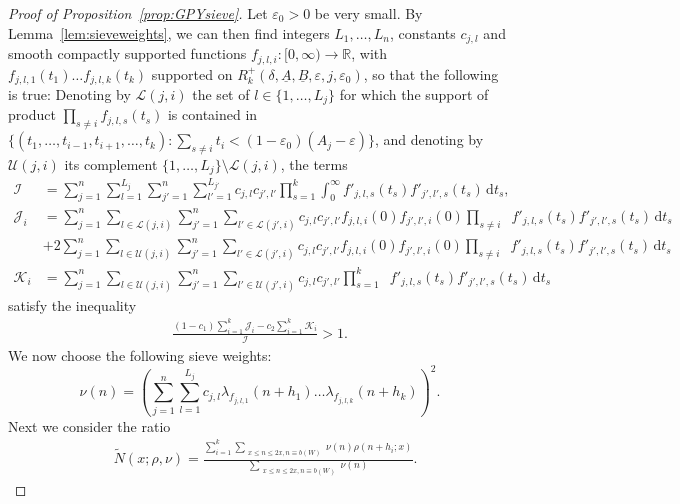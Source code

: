 \documentclass{amsart}
\numberwithin{equation}{section}
\begin{document}
\begin{proof}[Proof of Proposition~\ref{prop:GPYsieve}]
Let $\varepsilon_0>0$ be very small. By Lemma~\ref{lem:sieveweights}, we can then  find integers $L_1, \dots, L_n$, constants $c_{j,l}$    and   smooth compactly supported functions $f_{j,l,i}: [0,\infty) \rightarrow \mathbb{R}$, with  $f_{j,l,1}(t_1) \dots f_{j,l,k}(t_k)$ supported on $  R_k^+(\delta,\underline{A},\underline{B},\varepsilon,j,\varepsilon_0)$, so that the following is true: 
 Denoting by $\mathcal{L}(j,i)$  the set of $ l \in  \{1, \dots, L_j\}$ for which the  support of  product $\prod_{s\neq i} f_{j,l,s}(t_s) $ is contained in $\{(t_1, \dots, t_{i-1},t_{i+1}, \dots, t_k): \sum_{s \neq i} t_i < (1-\varepsilon_0)(A_j-\varepsilon)\}$, and denoting by    $\mathcal{U}(j,i)$  its   complement $\{1, \dots, L_j\} \setminus \mathcal{L}(j,i)$, 
the terms 
\begin{align*}
\mathcal{I}&=\sum_{j=1}^n\sum_{l=1}^{L_j} \sum_{j'=1}^n \sum_{l'=1}^{L_{j'}} c_{j,l} c_{j',l'}  \prod_{s=1}^k
\int_0^\infty    f'_{j,l,s}(t_s)f'_{j',l',s}(t_s) \, \mbox{d}t_s, \\
\mathcal{J}_i&=\sum_{j=1}^n \sum_{l \in  \mathcal{L}(j,i)}  \sum_{j'=1}^n  \sum_{l' \in  \mathcal{L}(j',i)}  c_{j,l}c_{j',l'} f_{j,l,i}(0)  f_{j',l',i}(0)  \prod_{s\neq i} \mathop{\int_0^\infty   }  f'_{j,l,s}(t_s)     f'_{j',l',s}(t_s)   \, \mbox{d}t_s \\
&+2\sum_{j=1}^n \sum_{l \in  \mathcal{U}(j,i)}  \sum_{j'=1}^n  \sum_{l' \in  \mathcal{L}(j',i)} c_{j,l}c_{j',l'} f_{j,l,i}(0)  f_{j',l',i}(0)  \prod_{s\neq i} \mathop{\int_0^\infty   }  f'_{j,l,s}(t_s)     f'_{j',l',s}(t_s)   \, \mbox{d}t_s\\
\mathcal{K}_i&=\sum_{j=1}^n \sum_{l \in  \mathcal{U}(j,i)}  \sum_{j'=1}^n  \sum_{l' \in  \mathcal{U}(j',i)}  c_{j,l}c_{j',l'}   \prod_{s=1}^k \mathop{\int_0^\infty} f'_{j,l,s}(t_s)     f'_{j',l',s}(t_s)    \, \mbox{d}t_s
\end{align*}
satisfy the inequality 
\begin{align*}
\frac{(1-c_1) \sum_{i=1}^k  \mathcal{J}_i - c_2 \sum_{i=1}^k  \mathcal{K}_i}{ \mathcal{I}} > 1.
\end{align*}
We now choose the following sieve weights:
 $$\nu(n)=\left(\sum_{j=1}^n\sum_{l=1}^{L_j} c_{j,l} \lambda_{f_{j,l,1}}(n+h_1) \dots \lambda_{f_{j,l,k}}(n+h_k)  \right)^2.$$  
Next we consider the ratio
\begin{align*}
&\widetilde{N}(x;\rho,\nu)=  \frac{\sum_{i=1}^k\sum_{\substack{x \leq n \leq 2x,  n \equiv b(W) }} \nu(n)   \rho(n+h_i;x) }{  \sum_{\substack{x \leq n \leq 2x,  n \equiv b(W) }} \nu(n)   }.

\end{align*}
\end{proof}
\end{document}
